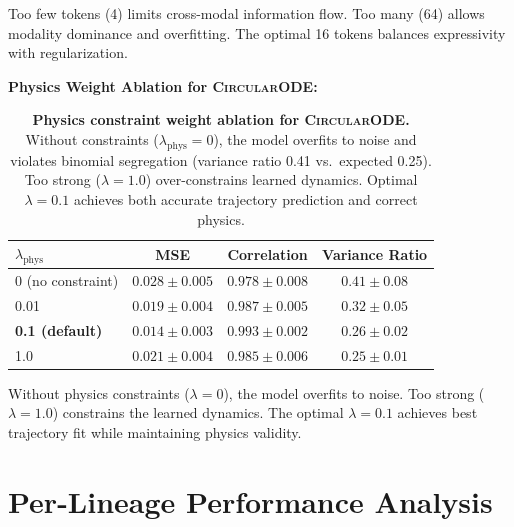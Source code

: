 \documentclass{article}
\newcommand{\circularode}{\textsc{CircularODE}}
\begin{document}
Too few tokens (4) limits cross-modal information flow. Too many (64) allows modality dominance and overfitting. The optimal 16 tokens balances expressivity with regularization.

\textbf{Physics Weight Ablation for \circularode{}:}

\begin{table}[ht]
\caption{\textbf{Physics constraint weight ablation for \circularode{}.} Without constraints ($\lambda_{\text{phys}}=0$), the model overfits to noise and violates binomial segregation (variance ratio 0.41 vs.\ expected 0.25). Too strong ($\lambda=1.0$) over-constrains learned dynamics. Optimal $\lambda=0.1$ achieves both accurate trajectory prediction and correct physics.}
\centering
\small
\begin{tabular}{@{}lccc@{}}
\toprule
$\lambda_{\text{phys}}$ & MSE & Correlation & Variance Ratio \\
\midrule
0 (no constraint) & $0.028 \pm 0.005$ & $0.978 \pm 0.008$ & $0.41 \pm 0.08$ \\
0.01 & $0.019 \pm 0.004$ & $0.987 \pm 0.005$ & $0.32 \pm 0.05$ \\
\textbf{0.1 (default)} & $\mathbf{0.014 \pm 0.003}$ & $\mathbf{0.993 \pm 0.002}$ & $\mathbf{0.26 \pm 0.02}$ \\
1.0 & $0.021 \pm 0.004$ & $0.985 \pm 0.006$ & $0.25 \pm 0.01$ \\
\bottomrule
\end{tabular}
\end{table}

Without physics constraints ($\lambda=0$), the model overfits to noise. Too strong ($\lambda=1.0$) constrains the learned dynamics. The optimal $\lambda=0.1$ achieves best trajectory fit while maintaining physics validity.

\section{Per-Lineage Performance Analysis}
\label{app:lineage}
\end{document}
